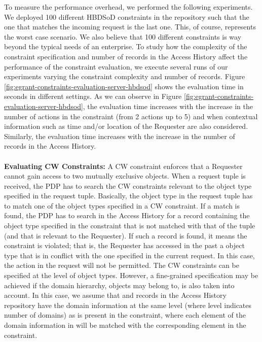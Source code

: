 \documentclass[epsfig,a4paper,11pt,titlepage]{book}
\numberwithin{algorithm}{chapter}
\begin{document}
To measure the performance overhead, we performed the following experiments. We deployed 100 different \gls{HBDSoD} constraints in the repository such that the one that matches the incoming request is the last one. This, of course, represents the worst case scenario. We also believe that 100 different constraints is way beyond the typical needs of an enterprise. To study how the complexity of the constraint specification and number of records in the Access History affect the performance of the constraint evaluation, we execute several runs of our experiments varying the constraint complexity and number of records. Figure \ref{fig:egrant-constraints-evaluation-server-hbdsod} shows the evaluation time in seconds in different settings. As we can observe in Figure \ref{fig:egrant-constraints-evaluation-server-hbdsod}, the evaluation time increases with the increase in the number of actions in the constraint (from 2 actions up to 5) and when contextual information such as time  and/or location  of the Requester are also considered. Similarly, the evaluation time increases with the increase in the number of records in the Access History. \\ \\
\noindent \textbf{Evaluating \gls{CW} Constraints:} A \gls{CW} constraint enforces that a Requester cannot gain access to two mutually exclusive objects. When a request  tuple is received, the \gls{PDP} has to search the \gls{CW} constraints relevant to the object type specified in the request tuple. Basically, the object type in the request tuple has to match one of the object types specified in a \gls{CW} constraint. If a match is found, the \gls{PDP} has to search in the Access History for a record containing the object type specified in the constraint that is not matched with that of the  tuple (and that is relevant to the Requester). If such a record is found, it means the constraint is violated; that is, the Requester has accessed in the past a object type that is in conflict with the one specified in the current request. In this case, the action in the request will not be permitted. The \gls{CW} constraints can be specified at the level of object types. However, a fine-grained specification may be achieved if the domain hierarchy, objects may belong to, is also taken into account. In this case, we assume that  and records in the Access History repository have the domain information at the same level (where level indicates number of domains) as is present in the constraint, where each element of the domain information in  will be matched with the corresponding element in the constraint.
\end{document}
